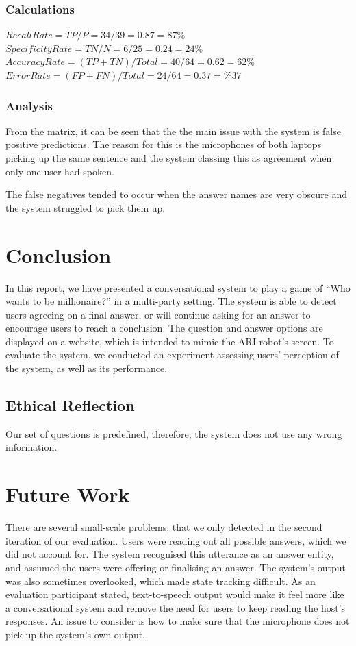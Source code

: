 \documentclass[hidelinks, 11pt]{article}
\begin{document}
\subsubsection{Calculations}
$Recall Rate = TP / P = 34 / 39 = 0.87 = 87\%$
$Specificity Rate = TN / N = 6 / 25 = 0.24 = 24\%$
$Accuracy Rate = (TP + TN) / Total = 40 / 64 = 0.62 = 62\%$
$Error Rate = (FP + FN) / Total = 24 / 64 = 0.37 = \%37$
\subsubsection{Analysis}
From the matrix, it can be seen that the the main issue with the system is false positive predictions. The reason for this is the microphones of both laptops picking up the same sentence and the system classing this as agreement when only one user had spoken.

The false negatives tended to occur when the answer names are very obscure and the system struggled to pick them up.

\section{Conclusion}
\label{sec:conclusion}

In this report, we have presented a conversational system to play a game of ``Who wants to be millionaire?'' in a multi-party setting. The system is able to detect users agreeing on a final answer, or will continue asking for an answer to encourage users to reach a conclusion. The question and answer options are displayed on a website, which is intended to mimic the ARI robot's screen.
To evaluate the system, we conducted an experiment assessing users' perception of the system, as well as its performance.

\subsection{Ethical Reflection}
\label{subsec:ethics}
Our set of questions is predefined, therefore, the system does not use any wrong information.


\section{Future Work}
\label{sec:future_work}

There are several small-scale problems, that we only detected in the second iteration of our evaluation. Users were reading out all possible answers, which we did not account for. The system recognised this utterance as an answer entity, and assumed the users were offering or finalising an answer. The system's output was also sometimes overlooked, which made state tracking difficult. As an evaluation participant stated, text-to-speech output would make it feel more like a conversational system and remove the need for users to keep reading the host's responses. An issue to consider is how to make sure that the microphone does not pick up the system's own output.
\end{document}
